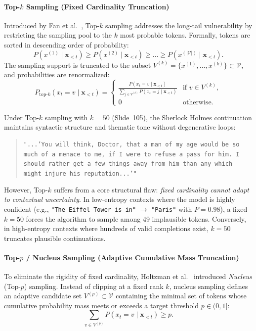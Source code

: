 \documentclass[../../main.tex]{subfiles}
\begin{document}
\paragraph{Top-$k$ Sampling (Fixed Cardinality Truncation)}
Introduced by Fan et al.~\cite{fan2018}, Top-$k$ sampling addresses the long-tail vulnerability by restricting the sampling pool to the $k$ most probable tokens. Formally, tokens are sorted in descending order of probability:
\begin{equation}
P(x^{(1)} \mid \mathbf{x}_{<t}) \ge P(x^{(2)} \mid \mathbf{x}_{<t}) \ge \dots \ge P(x^{(|\mathcal{V}|)} \mid \mathbf{x}_{<t}).
\end{equation}
The sampling support is truncated to the subset $V^{(k)} = \{x^{(1)}, \dots, x^{(k)}\} \subset \mathcal{V}$, and probabilities are renormalized:
\begin{equation}
P_{\text{top-}k}(x_t = v \mid \mathbf{x}_{<t}) = \begin{cases}
\frac{P(x_t = v \mid \mathbf{x}_{<t})}{\sum_{j \in V^{(k)}} P(x_t = j \mid \mathbf{x}_{<t})} & \text{if } v \in V^{(k)}, \\
0 & \text{otherwise}.
\end{cases}
\label{eq:top_k_renormalization}
\end{equation}

Under Top-$k$ sampling with $k=50$ (Slide~105), the Sherlock Holmes continuation maintains syntactic structure and thematic tone without degenerative loops:
\begin{quote}
\texttt{"...'You will think, Doctor, that a man of my age would be so much of a menace to me, if I were to refuse a pass for him. I should rather get a few things away from him than any which might injure his reputation...'"}
\end{quote}

However, Top-$k$ suffers from a core structural flaw: \emph{fixed cardinality cannot adapt to contextual uncertainty}. In low-entropy contexts where the model is highly confident (e.g., \texttt{"The Eiffel Tower is in"} $\to$ \texttt{"Paris"} with $P=0.98$), a fixed $k=50$ forces the algorithm to sample among 49 implausible tokens. Conversely, in high-entropy contexts where hundreds of valid completions exist, $k=50$ truncates plausible continuations.

\paragraph{Top-$p$ / Nucleus Sampling (Adaptive Cumulative Mass Truncation)}
To eliminate the rigidity of fixed cardinality, Holtzman et al.~\cite{holtzman2020} introduced \emph{Nucleus} (Top-$p$) sampling. Instead of clipping at a fixed rank $k$, nucleus sampling defines an adaptive candidate set $V^{(p)} \subset \mathcal{V}$ containing the minimal set of tokens whose cumulative probability mass meets or exceeds a target threshold $p \in (0, 1]$:
\begin{equation}
\sum_{v \in V^{(p)}} P(x_t = v \mid \mathbf{x}_{<t}) \ge p.
\label{eq:nucleus_set_definition}
\end{equation}
\end{document}
